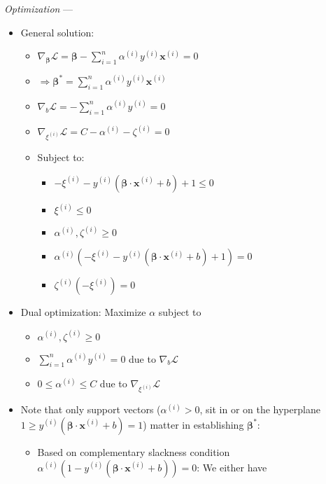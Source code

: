 \emph{Optimization} ---
\begin{itemize}
    \item General solution:
    \begin{itemize}
        \item $\nabla_{\boldsymbol{\beta}} \mathcal{L} =  \boldsymbol{\beta} - \sum_{i=1}^n \alpha^{(i)} y^{(i)} \boldsymbol{x}^{(i)} = 0$
        \item $\Rightarrow \boldsymbol{\beta}^{*} = \sum_{i=1}^n \alpha^{(i)} y^{(i)} \boldsymbol{x}^{(i)}$
        \item $\nabla_b \mathcal{L} = - \sum_{i=1}^n \alpha^{(i)} y^{(i)} = 0$
        \item $\nabla_{\xi^{(i)}} \mathcal{L} = C - \alpha^{(i)} - \zeta^{(i)} = 0$
        \item Subject to:
        \begin{itemize}
            \item $- \xi^{(i)} - y^{(i)} (\boldsymbol{\beta} \cdot \boldsymbol{x}^{(i)} + b) + 1 \leq 0$
            \item $\xi^{(i)} \leq 0$
            \item $\alpha^{(i)}, \zeta^{(i)} \geq 0$
            \item $\alpha^{(i)} (- \xi^{(i)} - y^{(i)} (\boldsymbol{\beta} \cdot \boldsymbol{x}^{(i)} + b) + 1) = 0$
            \item $\zeta^{(i)} (- \xi^{(i)}) = 0$
        \end{itemize}
    \end{itemize}
    \item Dual optimization: Maximize $\alpha$ subject to 
    \begin{itemize}
        \item $\alpha^{(i)}, \zeta^{(i)} \geq 0$ 
        \item $\sum_{i=1}^n \alpha^{(i)} y^{(i)} = 0$ due to $\nabla_b \mathcal{L}$
        \item $0 \leq \alpha^{(i)} \leq C$ due to $\nabla_{\xi^{(i)}} \mathcal{L}$ 
    \end{itemize}
    \item Note that only support vectors ($\alpha^{(i)} > 0$, sit in or on the hyperplane $ 1 \geq y^{(i)} (\boldsymbol{\beta} \cdot \boldsymbol{x}^{(i)} + b) = 1$) matter in establishing $\boldsymbol{\beta}^{*}$:
    \begin{itemize}
        \item Based on complementary slackness condition $\alpha^{(i)} (1 - y^{(i)} (\boldsymbol{\beta} \cdot \boldsymbol{x}^{(i)} + b)) = 0$: We either have 

\end{itemize}
\end{itemize}
